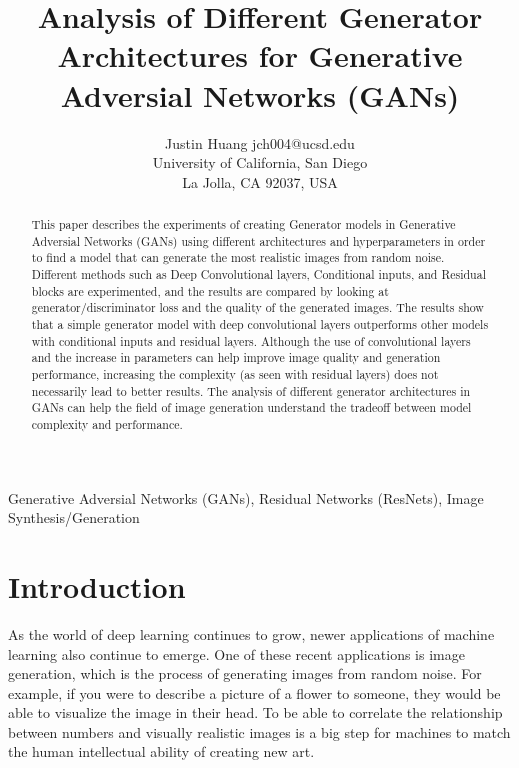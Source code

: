 \documentclass[twoside,11pt]{article}
\begin{document}
\title{Analysis of Different Generator Architectures for Generative Adversial Networks (GANs)}

\author{\name Justin Huang \email jch004@ucsd.edu \\
       University of California, San Diego\\
       La Jolla, CA 92037, USA
}

\maketitle

\begin{abstract}%
This paper describes the experiments of creating Generator models in Generative Adversial Networks (GANs) using different architectures and hyperparameters in order to find a model that can generate the most realistic images from random noise. Different methods such as Deep Convolutional layers, Conditional inputs, and Residual blocks are experimented, and the results are compared by looking at generator/discriminator loss and the quality of the generated images. The results show that a simple generator model with deep convolutional layers outperforms other models with conditional inputs and residual layers. Although the use of convolutional layers and the increase in parameters can help improve image quality and generation performance, increasing the complexity (as seen with residual layers) does not necessarily lead to better results. The analysis of different generator architectures in GANs can help the field of image generation understand the tradeoff between model complexity and performance.
\end{abstract}

\begin{keywords}
  Generative Adversial Networks (GANs), Residual Networks (ResNets), Image Synthesis/Generation
\end{keywords}

\section{Introduction}

As the world of deep learning continues to grow, newer applications of machine learning also continue to emerge. One of these recent applications is image generation, which is the process of generating images from random noise. For example, if you were to describe a picture of a flower to someone, they would be able to visualize the image in their head. To be able to correlate the relationship between numbers and visually realistic images is a big step for machines to match the human intellectual ability of creating new art. 
\end{document}
